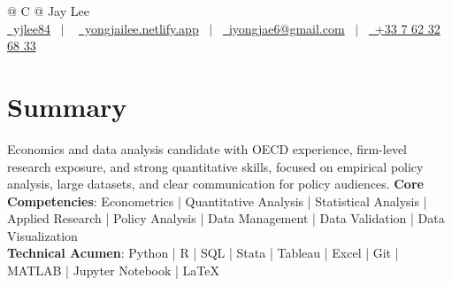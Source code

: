 \documentclass[a4paper,12pt]{article}
\begin{document}
\pagestyle{empty} 



\begin{tabularx}{\linewidth}{@{} C @{}}
\Huge{Jay Lee} \\[7.5pt]
\href{https://github.com/yjlee84}{\raisebox{-0.05\height}\faGithub\ yjlee84} \ $|$ \ 
\href{https://yongjailee.netlify.app}{\raisebox{-0.05\height}\faGlobe \ yongjailee.netlify.app} \ $|$ \ 
\href{mailto:email@mysite.com}{\raisebox{-0.05\height}\faEnvelope \ iyongjae6@gmail.com} \ $|$ \ 
\href{tel:+000000000000}{\raisebox{-0.05\height}\faMobile \ +33 7 62 32 68 33} \\
\end{tabularx}


\section{Summary}
Economics and data analysis candidate with OECD experience, firm-level research exposure, and strong quantitative skills, focused on empirical policy analysis, large datasets, and clear communication for policy audiences.
\textbf{Core Competencies}: Econometrics | Quantitative Analysis | Statistical Analysis | Applied Research | Policy Analysis | Data Management | Data Validation | Data Visualization\\
\textbf{Technical Acumen}: Python | R | SQL | Stata | Tableau | Excel | Git | MATLAB | Jupyter Notebook | \LaTeX{}
\end{document}
